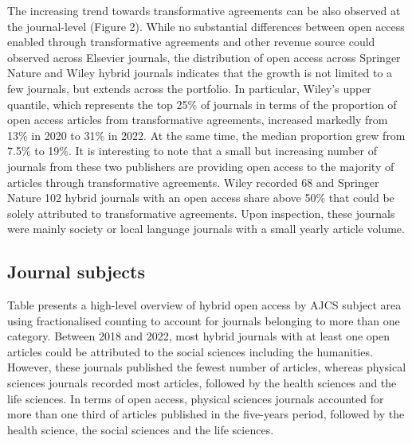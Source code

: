 \documentclass[a4paper,man,floatsintext,longtable,noextraspace,12pt]{apa6}
\begin{document}
The increasing trend towards transformative agreements can be also
observed at the journal-level (Figure 2). While no substantial
differences between open access enabled through transformative
agreements and other revenue source could observed across Elsevier
journals, the distribution of open access across Springer Nature and
Wiley hybrid journals indicates that the growth is not limited to a few
journals, but extends across the portfolio. In particular, Wiley's upper
quantile, which represents the top 25\% of journals in terms of the
proportion of open access articles from transformative agreements,
increased markedly from 13\% in 2020 to 31\% in 2022. At the same time,
the median proportion grew from 7.5\% to 19\%. It is interesting to note
that a small but increasing number of journals from these two publishers
are providing open access to the majority of articles through
transformative agreements. Wiley recorded 68 and Springer Nature 102
hybrid journals with an open access share above 50\% that could be
solely attributed to transformative agreements. Upon inspection, these
journals were mainly society or local language journals with a small
yearly article volume.

\hypertarget{journal-subjects}{%
\subsection{Journal subjects}\label{journal-subjects}}

Table presents a high-level overview of hybrid open access by AJCS
subject area using fractionalised counting to account for journals
belonging to more than one category. Between 2018 and 2022, most hybrid
journals with at least one open articles could be attributed to the
social sciences including the humanities. However, these journals
published the fewest number of articles, whereas physical sciences
journals recorded most articles, followed by the health sciences and the
life sciences. In terms of open access, physical sciences journals
accounted for more than one third of articles published in the
five-years period, followed by the health science, the social sciences
and the life sciences.
\end{document}
